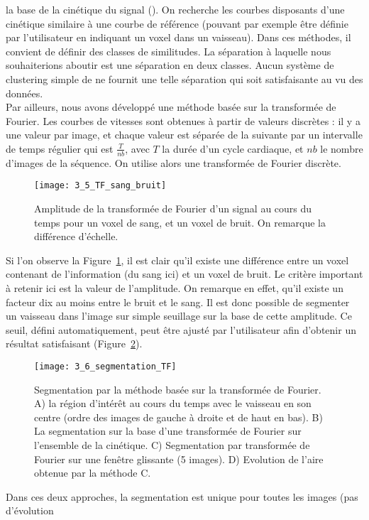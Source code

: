 la base de la cinétique du signal (\cite{Gaffney2004}). On recherche les courbes disposants d’une cinétique similaire à
une courbe de référence (pouvant par exemple être définie par l’utilisateur en indiquant un voxel dans
un vaisseau). Dans ces méthodes, il convient de définir des classes de similitudes. La séparation à
laquelle nous souhaiterions aboutir est une séparation en deux classes. Aucun système de clustering
simple de ne fournit une telle séparation qui soit satisfaisante au vu des données.\\
Par ailleurs, nous avons développé une méthode basée sur la transformée de Fourier. Les courbes
de vitesses sont obtenues à partir de valeurs discrètes : il y a une valeur par image, et chaque valeur
est séparée de la suivante par un intervalle de temps régulier qui est $\frac{T}{nb}$, avec $T$ la durée d’un cycle
cardiaque, et $nb$ le nombre d’images de la séquence. On utilise alors une transformée de Fourier
discrète. 
\begin{figure}[!t]
\centering
\texttt{[image: 3\_5\_TF\_sang\_bruit]}
\caption{Amplitude de la transformée de Fourier d’un signal au cours du temps pour un voxel de sang, et un voxel de bruit.
On remarque la différence d'échelle.}
\label{fig:3_5_TF_sang_bruit}	
\end{figure}
Si l’on observe la Figure~\ref{fig:3_5_TF_sang_bruit}, il est clair qu’il existe une différence entre un voxel contenant de
l’information (du sang ici) et un voxel de bruit. Le critère important à retenir ici est la valeur de
l’amplitude. On remarque en effet, qu’il existe un facteur dix au moins entre le bruit et le sang. Il est
donc possible de segmenter un vaisseau dans l’image sur simple seuillage sur la base de cette
amplitude. Ce seuil, défini automatiquement, peut être ajusté par l’utilisateur afin d’obtenir un résultat
satisfaisant (Figure~\ref{fig:3_6_segmentation_TF}).
\begin{figure}[!t]
\centering
\texttt{[image: 3\_6\_segmentation\_TF]}
\caption{Segmentation par la méthode basée sur la transformée de Fourier. A) la région d’intérêt au cours du temps avec
le vaisseau en son centre (ordre des images de gauche à droite et de haut en bas). B) La segmentation sur la base d’une
transformée de Fourier sur l’ensemble de la cinétique. C) Segmentation par transformée de Fourier sur une fenêtre glissante
(5 images). D) Evolution de l’aire obtenue par la méthode C.}
\label{fig:3_6_segmentation_TF}	
\end{figure}
Dans ces deux approches, la segmentation est unique pour toutes les images (pas d’évolution
